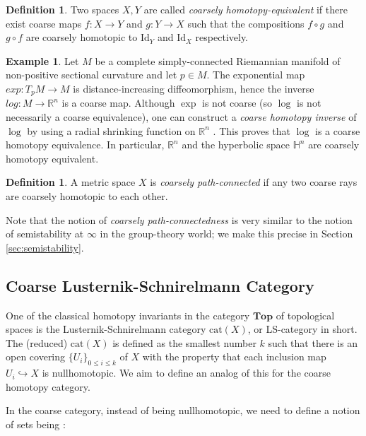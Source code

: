 \documentclass {amsart}
\newcommand {\cat}     {\text{cat}}
\newcommand {\Id}       {\text{Id}}
\newcommand {\R}        {\mathbb{R}}
\newcommand {\Top}       {\textbf{Top}}
\theoremstyle {definition}
\newtheorem   {definition}  [theorem] {Definition}
\newtheorem   {example}  [theorem] {Example}
\begin{document}
\begin{definition}
    Two spaces \( X, Y \) are called \emph{coarsely homotopy-equivalent} if there
    exist coarse maps \( f : X \to Y \) and \( g : Y \to X \) such that the
    compositions \( f \circ g \) and \( g \circ f \) are coarsely homotopic to
    \( \Id_Y \) and \( \Id_X \) respectively.
\end{definition}

\begin{example}
    Let \( M \) be a complete simply-connected Riemannian manifold of non-positive
    sectional curvature and let \( p \in M \). The exponential map \( exp : T_p M 
    \to M \) is distance-increasing diffeomorphism, hence the inverse \( log : M
    \to \R^{n} \) is a coarse map. Although \( \exp \) is not coarse (so \( \log
    \) is not necessarily a coarse equivalence), one can construct a \emph{coarse
    homotopy inverse} of \( \log \) by using a radial shrinking function on \(
    \R^{n} \) \cite[Example 2.7]{mitchenerCoarseHomotopyGroups2020}. This proves
    that \( \log \) is a coarse homotopy equivalence. In particular, \( \R^{n} \)
    and the hyperbolic space \( \mathbb{H}^{n} \) are coarsely homotopy
    equivalent.
\end{example}

\begin{definition}
    A metric space \( X \) is \emph{coarsely path-connected} if any two coarse
    rays are coarsely homotopic to each other.
\end{definition}
%
Note that the notion of \emph{ coarsely path-connectedness} is very similar to the
notion of semistability at \( \infty \) in the group-theory world; we make this
precise in Section \ref{sec:semistability}.

\subsection {Coarse Lusternik-Schnirelmann Category}

One of the classical homotopy invariants in the category \( \Top \) of
topological spaces is the Lusternik-Schnirelmann category \( \cat (X) \), or
LS-category in short. The (reduced) \( \cat (X)\) is defined as the smallest
number \( k \) such that there is an open covering \( \{ U_i \}_{0 \leq i \leq
k} \) of \( X \) with the property that each inclusion map \( U_i
\hookrightarrow X \) is nullhomotopic. We aim to define an analog of this for
the coarse homotopy category.

In the coarse category, instead of being nullhomotopic, we need to define a
notion of sets being :
\end{document}
